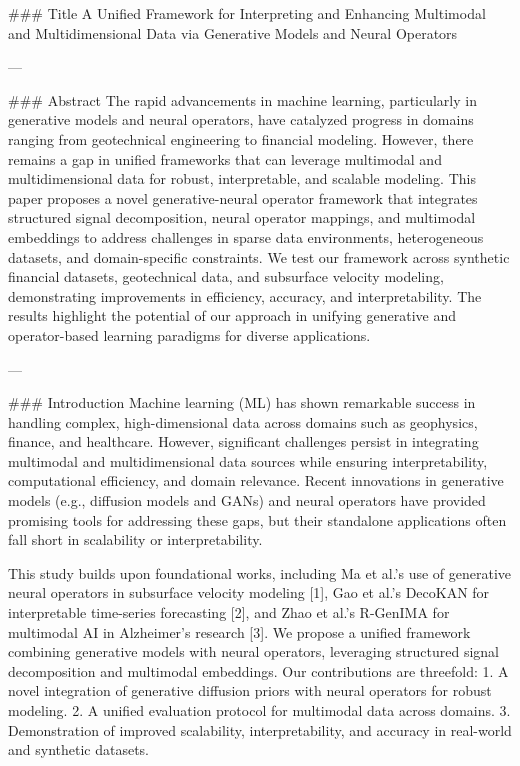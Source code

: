 ### Title  
A Unified Framework for Interpreting and Enhancing Multimodal and Multidimensional Data via Generative Models and Neural Operators  

---

### Abstract  
The rapid advancements in machine learning, particularly in generative models and neural operators, have catalyzed progress in domains ranging from geotechnical engineering to financial modeling. However, there remains a gap in unified frameworks that can leverage multimodal and multidimensional data for robust, interpretable, and scalable modeling. This paper proposes a novel generative-neural operator framework that integrates structured signal decomposition, neural operator mappings, and multimodal embeddings to address challenges in sparse data environments, heterogeneous datasets, and domain-specific constraints. We test our framework across synthetic financial datasets, geotechnical data, and subsurface velocity modeling, demonstrating improvements in efficiency, accuracy, and interpretability. The results highlight the potential of our approach in unifying generative and operator-based learning paradigms for diverse applications.  

---

### Introduction  
Machine learning (ML) has shown remarkable success in handling complex, high-dimensional data across domains such as geophysics, finance, and healthcare. However, significant challenges persist in integrating multimodal and multidimensional data sources while ensuring interpretability, computational efficiency, and domain relevance. Recent innovations in generative models (e.g., diffusion models and GANs) and neural operators have provided promising tools for addressing these gaps, but their standalone applications often fall short in scalability or interpretability.  

This study builds upon foundational works, including Ma et al.'s use of generative neural operators in subsurface velocity modeling [1], Gao et al.'s DecoKAN for interpretable time-series forecasting [2], and Zhao et al.'s R-GenIMA for multimodal AI in Alzheimer's research [3]. We propose a unified framework combining generative models with neural operators, leveraging structured signal decomposition and multimodal embeddings. Our contributions are threefold:  
1. A novel integration of generative diffusion priors with neural operators for robust modeling.  
2. A unified evaluation protocol for multimodal data across domains.  
3. Demonstration of improved scalability, interpretability, and accuracy in real-world and synthetic datasets.  

